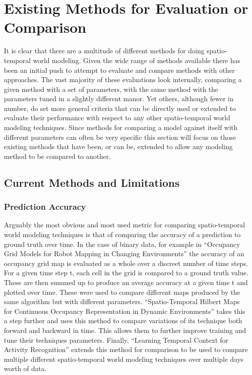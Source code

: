   \section{ Existing Methods for Evaluation or Comparison }

  It is clear that there are a multitude of different methods for doing
  spatio-temporal world modeling. Given the wide range of methods available
  there has been an initial push to attempt to evaluate and compare methods
  with other approaches. The vast majority of these evaluations look internally,
  comparing a given method with a set of parameters, with the same method with
  the parameters tuned in a slightly different manor. Yet others, although fewer
  in number, do set more general criteria that can be directly used or extended
  to evaluate their performance with respect to any other spatio-temporal
  world modeling techniques. Since methods for comparing a model against itself
  with different parameters can often be very specific this section will focus
  on those existing methods that have been, or can be, extended to allow any
  modeling method to be compared to another.

  \subsection{ Current Methods and Limitations}

  \subsubsection { Prediction Accuracy }
  Arguably the most obvious and most used metric for comparing spatio-temporal
  world modeling techniques is that of comparing the accuracy of a prediction
  to ground truth over time. In the case of binary data, for example in
  ``Occupancy Grid Models for Robot Mapping in Changing Environments''
  \cite{Meyer-Delius2012} the accuracy of an occupancy grid map is evaluated as
  a whole over a discreet number of time steps. For a given time step t,
  each cell in the grid is compared to a ground truth value. These are then
  summed up to produce an average accuracy at a given time t and plotted over
  time. These were used to compare different maps produced by the same algorithm
  but with different parameters. ``Spatio-Temporal Hilbert Maps for Continuous
  Occupancy Representation in Dynamic Environments'' \cite{Senanayake2016}
  takes this a step further and uses this method to compare variations of its
  technique both forward and backward in time. This allows them to further
  improve training and tune their techniques parameters. Finally, ``Learning Temporal Context for Activity Recognition'' \cite{Coppola2016}
  extends this method for comparison to be used to compare multiple different
  spatio-temporal world modeling techniques over multiple days worth of data.

